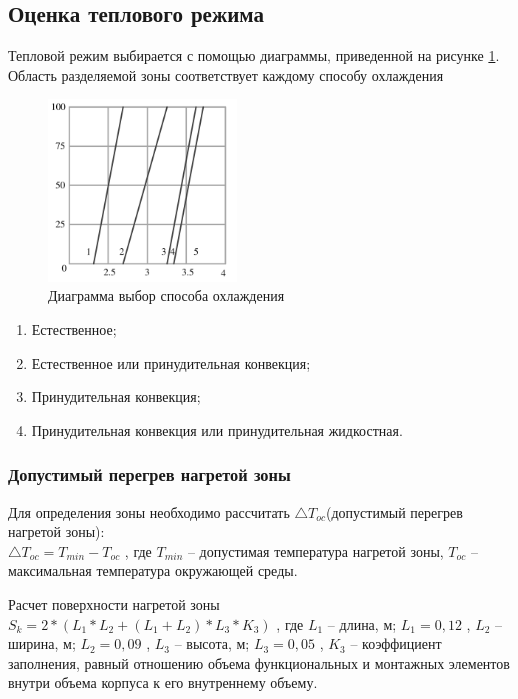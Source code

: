 		\subsection{Оценка теплового режима}
				Тепловой режим выбирается с помощью диаграммы, приведенной на рисунке \ref{projectp1}. Область
			разделяемой зоны соответствует каждому способу охлаждения
			\begin{figure}[ht!]
				\centering
				\includegraphics[width=50mm]{src/pictures/projectp1.png}
				\caption{Диаграмма выбор способа охлаждения}\label{projectp1}
			\end{figure}
			\begin{enumerate}
				\changefontsizes[14pt]{14pt}
				\setlength{\itemsep}{0pt}
				\item Естественное;
				\item Естественное или принудительная конвекция;
				\item Принудительная конвекция;
				\item Принудительная конвекция или принудительная жидкостная.
			\end{enumerate}
			\subsubsection{Допустимый перегрев нагретой зоны}
					Для определения зоны необходимо рассчитать $\bigtriangleup T_{oc}$(допустимый перегрев нагретой зоны): \\
				$\bigtriangleup T_{oc} = T_{min} - T_{oc}$
				, где $T_{min}$ – допустимая температура нагретой зоны,
				$T_{oc}$ – максимальная температура окружающей среды.

					Расчет поверхности нагретой зоны \\
				$S_k = 2 * (L_1 * L_2 + (L_1 + L_2) * L_3 * K_3)$
				, где $L_1$ – длина, м; $L_1 = 0,12$
				, $L_2$ – ширина, м; $L_2 = 0,09$
				, $L_3$ – высота, м; $L_3 = 0,05$
				, $K_3$ – коэффициент заполнения, равный отношению объема функциональных и монтажных элементов внутри объема корпуса к его внутреннему объему.
